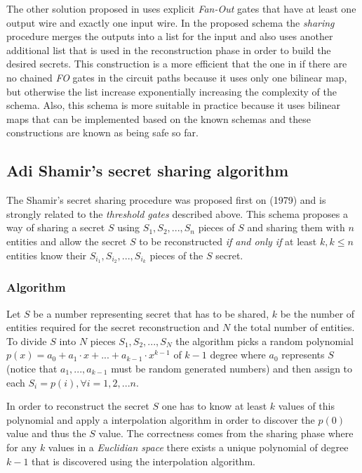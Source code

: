 \documentclass[12pt]{article}
\begin{document}
The other solution proposed in \cite{fltccd} uses explicit \textit{Fan-Out} gates that have at least one output wire and exactly one input wire. In the proposed schema the \textit{sharing} procedure merges the outputs into a list for the input and also uses another additional list that is used in the reconstruction phase in order to build the desired secrets. This construction is a more efficient that the one in \cite{gghsw} if there are no chained \textit{FO} gates in the circuit paths because it uses only one bilinear map, but otherwise the list increase exponentially increasing the complexity of the schema. Also, this schema is more suitable in practice because it uses bilinear maps that can be implemented based on the known schemas and these constructions are known as being safe so far.

\subsection{Adi Shamir's secret sharing algorithm}

The Shamir's secret sharing procedure was proposed first on \cite{shamir}(1979) and is strongly related to the \textit{threshold gates} described above. This schema proposes a way of sharing a secret $S$ using $S_1, S_2, ..., S_n$ pieces of $S$ and sharing them with $n$ entities and allow the secret $S$ to be reconstructed \textit{if and only if} at least $k, k \le n$ entities know their $S_{i_1}, S_{i_2}, ..., S_{i_k}$ pieces of the $S$ secret. 

\subsubsection{Algorithm}

Let $S$ be a number representing secret that has to be shared, $k$ be the number of entities required for the secret reconstruction and $N$ the total number of entities. To divide $S$ into $N$ pieces $S_1, S_2, ..., S_N$ the algorithm picks a random polynomial $p(x) = a_0 + a_1 \cdot x + ... + a_{k - 1} \cdot x^{k - 1}$ of $k - 1$ degree where $a_0$ represents $S$ (notice that $a_1, ..., a_{k - 1}$ must be random generated numbers) and then assign to each $S_i = p(i), \forall i = {1, 2, ... n}$.

In order to reconstruct the secret $S$ one has to know at least $k$ values of this polynomial and apply a interpolation algorithm in order to discover the $p(0)$ value and thus the $S$ value. The correctness comes from the sharing phase where for any $k$ values in a \textit{Euclidian space} there exists a unique polynomial of degree $k - 1$ that is discovered using the interpolation algorithm.
\end{document}
